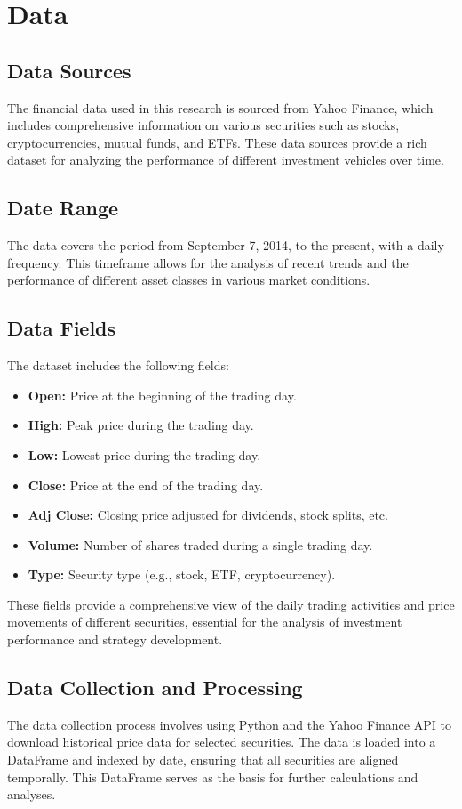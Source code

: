 \section{Data}

\subsection{Data Sources}
The financial data used in this research is sourced from Yahoo Finance, which includes comprehensive information on various securities such as stocks, cryptocurrencies, mutual funds, and ETFs. These data sources provide a rich dataset for analyzing the performance of different investment vehicles over time.

\subsection{Date Range}
The data covers the period from September 7, 2014, to the present, with a daily frequency. This timeframe allows for the analysis of recent trends and the performance of different asset classes in various market conditions.

\subsection{Data Fields}
The dataset includes the following fields:
\begin{itemize}
    \item \textbf{Open:} Price at the beginning of the trading day.
    \item \textbf{High:} Peak price during the trading day.
    \item \textbf{Low:} Lowest price during the trading day.
    \item \textbf{Close:} Price at the end of the trading day.
    \item \textbf{Adj Close:} Closing price adjusted for dividends, stock splits, etc.
    \item \textbf{Volume:} Number of shares traded during a single trading day.
    \item \textbf{Type:} Security type (e.g., stock, ETF, cryptocurrency).
\end{itemize}
These fields provide a comprehensive view of the daily trading activities and price movements of different securities, essential for the analysis of investment performance and strategy development.

\subsection{Data Collection and Processing}
The data collection process involves using Python and the Yahoo Finance API to download historical price data for selected securities. The data is loaded into a DataFrame and indexed by date, ensuring that all securities are aligned temporally. This DataFrame serves as the basis for further calculations and analyses.

